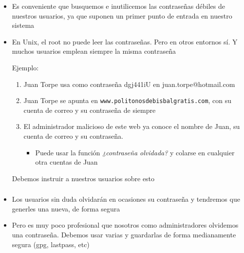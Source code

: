 \documentclass[ucs]{beamer}
\begin{document}
\begin{frame}[fragile]
\begin{itemize}
\item
Es conveniente que busquemos e inutilicemos las contraseñas débiles de nuestros usuarios, ya que suponen un primer punto de entrada en nuestro sistema
\item
En Unix, el root no puede leer las contraseñas. Pero en otros entornos sí. Y muchos usuarios emplean siempre la misma contraseña

Ejemplo:
\begin{enumerate}
\item Juan Torpe usa como contraseña  dgj441iU en juan.torpe@hotmail.com
\item Juan Torpe se apunta en \verb|www.politonosdebisbalgratis.com|, con su cuenta de correo y su contraseña de siempre
\item El administrador malicioso de este web ya conoce el nombre de Juan, su cuenta de correo y su contraseña.
\begin{itemize}
\item Puede usar la función \emph{¿contraseña olvidada?}  y colarse en cualquier otra cuentas de Juan
\end{itemize}
\end{enumerate}

Debemos instruir a nuestros usuarios sobre esto
\end{itemize}

\end{frame}



\begin{frame}[fragile]
\frametitle{}
\begin{itemize}
\item
Los usuarios sin duda olvidarán en ocasiones su contraseña y tendremos que generles una nueva, de forma segura
\item
Pero es muy poco profesional que nosotros como administradores olvidemos una contraseña. Debemos usar varias y guardarlas de
forma medianamente segura (gpg, lastpass, etc)
\end{itemize}

\end{frame}
\end{document}
